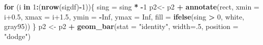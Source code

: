\documentclass[
]{article}
\newenvironment{Shaded}{\begin{snugshade}}{\end{snugshade}}
\newcommand{\AttributeTok}[1]{\textcolor[rgb]{0.13,0.29,0.53}{#1}}
\newcommand{\ConstantTok}[1]{\textcolor[rgb]{0.56,0.35,0.01}{#1}}
\newcommand{\ControlFlowTok}[1]{\textcolor[rgb]{0.13,0.29,0.53}{\textbf{#1}}}
\newcommand{\DecValTok}[1]{\textcolor[rgb]{0.00,0.00,0.81}{#1}}
\newcommand{\FloatTok}[1]{\textcolor[rgb]{0.00,0.00,0.81}{#1}}
\newcommand{\FunctionTok}[1]{\textcolor[rgb]{0.13,0.29,0.53}{\textbf{#1}}}
\newcommand{\NormalTok}[1]{#1}
\newcommand{\OtherTok}[1]{\textcolor[rgb]{0.56,0.35,0.01}{#1}}
\newcommand{\SpecialCharTok}[1]{\textcolor[rgb]{0.81,0.36,0.00}{\textbf{#1}}}
\newcommand{\StringTok}[1]{\textcolor[rgb]{0.31,0.60,0.02}{#1}}
\begin{document}
\begin{Shaded}
\begin{Highlighting}[]
\ControlFlowTok{for}\NormalTok{ (i }\ControlFlowTok{in} \DecValTok{1}\SpecialCharTok{:}\NormalTok{(}\FunctionTok{nrow}\NormalTok{(sigdf)}\SpecialCharTok{{-}}\DecValTok{1}\NormalTok{))\{}
\NormalTok{  sing }\OtherTok{=}\NormalTok{ sing }\SpecialCharTok{*} \SpecialCharTok{{-}}\DecValTok{1}
\NormalTok{  p2}\OtherTok{\textless{}{-}}\NormalTok{ p2 }\SpecialCharTok{+} \FunctionTok{annotate}\NormalTok{(}\StringTok{\textquotesingle{}rect\textquotesingle{}}\NormalTok{, }\AttributeTok{xmin =}\NormalTok{ i}\FloatTok{+0.5}\NormalTok{, }\AttributeTok{xmax =}\NormalTok{ i}\FloatTok{+1.5}\NormalTok{, }\AttributeTok{ymin =} \SpecialCharTok{{-}}\ConstantTok{Inf}\NormalTok{, }\AttributeTok{ymax =} \ConstantTok{Inf}\NormalTok{,}
                      \AttributeTok{fill =} \FunctionTok{ifelse}\NormalTok{(sing }\SpecialCharTok{\textgreater{}} \DecValTok{0}\NormalTok{, }\StringTok{\textquotesingle{}white\textquotesingle{}}\NormalTok{, }\StringTok{\textquotesingle{}gray95\textquotesingle{}}\NormalTok{))}
\NormalTok{\}}
\NormalTok{p2 }\OtherTok{\textless{}{-}}\NormalTok{ p2 }\SpecialCharTok{+} \FunctionTok{geom\_bar}\NormalTok{(}\AttributeTok{stat =} \StringTok{"identity"}\NormalTok{, }\AttributeTok{width=}\NormalTok{.}\DecValTok{5}\NormalTok{, }\AttributeTok{position =} \StringTok{"dodge"}\NormalTok{)}


\end{Highlighting}
\end{Shaded}
\end{document}
